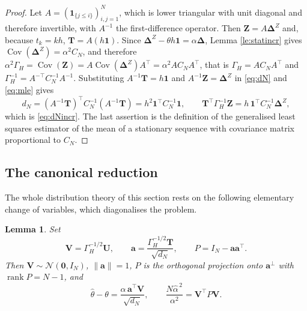 \documentclass[11pt,reqno]{amsart}
\numberwithin{equation}{section}
\theoremstyle{plain}
\newtheorem{lemma}[theorem]{Lemma}
\theoremstyle{definition}
\theoremstyle{remark}
\newcommand{\bT}{\mathbf{T}}
\newcommand{\bZ}{\mathbf{Z}}
\newcommand{\bU}{\mathbf{U}}
\newcommand{\bV}{\mathbf{V}}
\newcommand{\bDelta}{\boldsymbol{\Delta}}
\newcommand{\bone}{\mathbf{1}}
\newcommand{\ba}{\mathbf{a}}
\newcommand{\bze}{\mathbf{0}}
\newcommand{\GH}{\Gamma_H}
\newcommand{\Norm}{\mathcal{N}}
\DeclareMathOperator{\Cov}{Cov}
\DeclareMathOperator{\rank}{rank}
\begin{document}
\begin{proof}
Let $A=(\mathbf 1_{\{j\le i\}})_{i,j=1}^{N}$, which is lower triangular with unit
diagonal and therefore invertible, with $A^{-1}$ the first-difference operator. Then
$\bZ=A\bDelta^{Z}$ and, because $t_k=kh$, $\bT=A(h\bone)$. Since
$\bDelta^{Z}-\theta h\bone=\alpha\bDelta$, Lemma \ref{le:statincr} gives
$\Cov(\bDelta^{Z})=\alpha^{2}C_N$, and therefore
$\alpha^{2}\GH=\Cov(\bZ)=A\Cov(\bDelta^{Z})A^{\top}=\alpha^{2}AC_NA^{\top}$, that is
$\GH=AC_NA^{\top}$ and $\GH^{-1}=A^{-\top}C_N^{-1}A^{-1}$. Substituting $A^{-1}\bT=h\bone$ and
$A^{-1}\bZ=\bDelta^{Z}$ in \eqref{eq:dN} and \eqref{eq:mle} gives
\[
  d_N=(A^{-1}\bT)^{\top}C_N^{-1}(A^{-1}\bT)=h^{2}\bone^{\top}C_N^{-1}\bone,
  \qquad
  \bT^{\top}\GH^{-1}\bZ=h\,\bone^{\top}C_N^{-1}\bDelta^{Z},
\]
which is \eqref{eq:dNincr}. The last assertion is the definition of the generalised least
squares estimator of the mean of a stationary sequence with covariance matrix
proportional to $C_N$.
\end{proof}

\subsection{The canonical reduction}
The whole distribution theory of this section rests on the following elementary change of
variables, which diagonalises the problem.

\begin{lemma}\label{le:canon}
Set
\begin{equation}\label{eq:canon}
  \bV=\GH^{-1/2}\bU,\qquad
  \ba=\frac{\GH^{-1/2}\bT}{\sqrt{d_N}},\qquad
  P=I_N-\ba\ba^{\top}.
\end{equation}
Then $\bV\sim\Norm(\bze,I_N)$, $\|\ba\|=1$, $P$ is the orthogonal projection onto
$\ba^{\perp}$ with $\rank P=N-1$, and
\begin{equation}\label{eq:canonid}
  \widehat\theta-\theta=\frac{\alpha\,\ba^{\top}\bV}{\sqrt{d_N}},
  \qquad
  \frac{N\widehat\alpha^{\,2}}{\alpha^{2}}=\bV^{\top}P\bV .
\end{equation}
\end{lemma}
\end{document}
